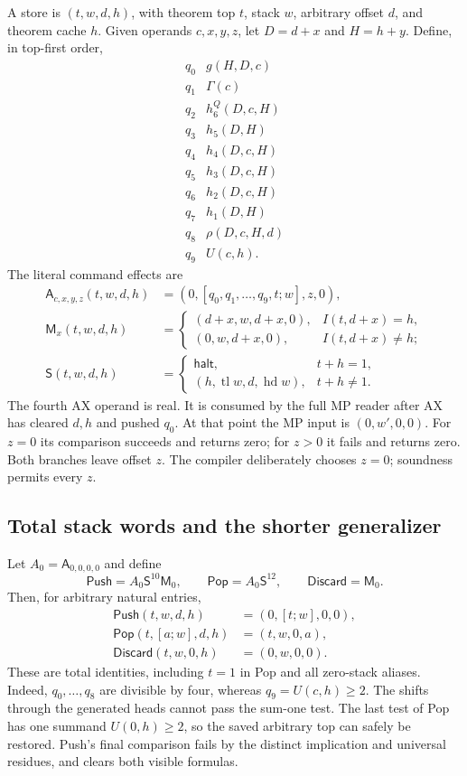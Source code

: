 A store is $(t,w,d,h)$, with theorem top $t$, stack $w$, arbitrary offset $d$,
and theorem cache $h$. Given operands $c,x,y,z$, let $D=d+x$ and $H=h+y$.
Define, in top-first order,
\[
\begin{array}{c|l}
q_0&g(H,D,c)\\q_1&\Gamma(c)\\q_2&h_6^Q(D,c,H)\\q_3&h_5(D,H)\\
q_4&h_4(D,c,H)\\q_5&h_3(D,c,H)\\q_6&h_2(D,c,H)\\
q_7&h_1(D,H)\\q_8&\rho(D,c,H,d)\\q_9&U(c,h).
\end{array}
\]
The literal command effects are
\begin{align*}
 \mathsf A_{c,x,y,z}(t,w,d,h)
   &=(0,[q_0,q_1,\ldots,q_9,t;w],z,0),\\
 \mathsf M_x(t,w,d,h)
   &=\begin{cases}(d+x,w,d+x,0),&I(t,d+x)=h,\\
                   (0,w,d+x,0),&I(t,d+x)\ne h;\end{cases}\\
 \mathsf S(t,w,d,h)
   &=\begin{cases}\mathsf{halt},&t+h=1,\\
        (h,\operatorname{tl}w,d,\operatorname{hd}w),&t+h\ne1.
       \end{cases}
\end{align*}
The fourth AX operand is real. It is consumed by the full MP reader after
AX has cleared $d,h$ and pushed $q_0$. At that point the MP input is
$(0,w',0,0)$. For $z=0$ its comparison succeeds and returns zero; for
$z>0$ it fails and returns zero. Both branches leave offset $z$.
The compiler deliberately chooses $z=0$; soundness permits every $z$.

\subsection{Total stack words and the shorter generalizer}

Let $A_0=\mathsf A_{0,0,0,0}$ and define
\[
 \mathsf{Push}=A_0\mathsf S^{10}\mathsf M_0,\qquad
 \mathsf{Pop}=A_0\mathsf S^{12},\qquad
 \mathsf{Discard}=\mathsf M_0.
\]
Then, for arbitrary natural entries,
\begin{align*}
 \mathsf{Push}(t,w,d,h)&=(0,[t;w],0,0),\\
 \mathsf{Pop}(t,[a;w],d,h)&=(t,w,0,a),\\
 \mathsf{Discard}(t,w,0,h)&=(0,w,0,0).
\end{align*}
These are total identities, including $t=1$ in Pop and all zero-stack aliases.
Indeed, $q_0,\ldots,q_8$ are divisible by four, whereas $q_9=U(c,h)\ge2$.
The shifts through the generated heads cannot pass the sum-one test.
The last test of Pop has one summand $U(0,h)\ge2$, so the saved arbitrary
top can safely be restored. Push's final comparison fails by the distinct
implication and universal residues, and clears both visible formulas.

